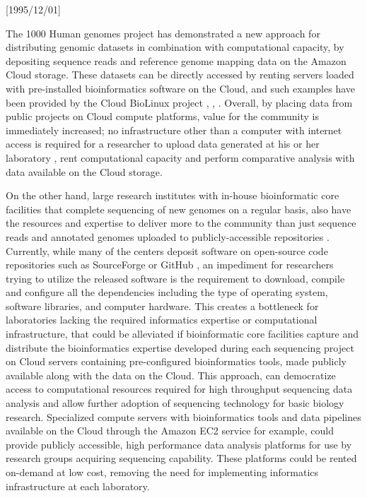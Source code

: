 \NeedsTeXFormat{LaTeX2e}[1995/12/01] \documentclass[10pt]{bmc_article}
\newenvironment{bmcformat}{\begin{raggedright}\baselineskip20pt\sloppy\setboolean{publ}{false}}{\end{raggedright}\baselineskip20pt\sloppy}
\begin{document}
\begin{bmcformat}
The 1000 Human genomes project \cite{clarke2012} has demonstrated a new approach for distributing genomic datasets 
in combination with computational capacity, by depositing sequence reads and reference genome mapping data on the 
Amazon Cloud storage. These datasets can be directly accessed by renting servers loaded with pre-installed bioinformatics 
software on the Cloud, and such examples have been provided by the Cloud BioLinux project \cite{1000tube1},  \cite{1000tube2}, 
\cite{Krampis2012}. Overall, by placing data from public projects on Cloud compute platforms, value for the community is 
immediately increased; no infrastructure other than a computer with internet access is required for a researcher to upload 
data generated at his or her laboratory , rent computational capacity and perform comparative analysis with 
data available on the Cloud storage. \pb

On the other hand, large research institutes with in-house bioinformatic core facilities that complete sequencing of new 
genomes on a regular basis, also have the resources and expertise to deliver more to the community than just sequence 
reads and annotated genomes uploaded to publicly-accessible repositories \cite{Pruitt2009}.  Currently, while many of the centers 
deposit software on open-source code repositories such as SourceForge \cite{sourceforge} or GitHub \cite{github}, an 
impediment for researchers trying to utilize the released software is the requirement to download, compile and configure all the 
dependencies including the type of operating system, software libraries, and computer hardware. This creates a bottleneck 
for laboratories lacking the required informatics expertise or computational infrastructure, that could be alleviated if bioinformatic
core facilities capture and distribute the bioinformatics expertise developed during each sequencing project on Cloud servers 
containing pre-configured bioinformatics tools, made publicly available along with the data on the Cloud. This approach,
can democratize access to computational resources required for high throughput sequencing data analysis and 
allow further  adoption of sequencing technology for basic biology research. Specialized compute servers with bioinformatics tools 
and data pipelines available on the Cloud through the Amazon EC2 service for example, could provide publicly accessible, 
high performance data analysis platforms for use by research groups acquiring sequencing capability. These platforms 
could be rented  on-demand at low cost, removing the need for implementing informatics infrastructure at each laboratory. \pb



\end{bmcformat}
\end{document}
